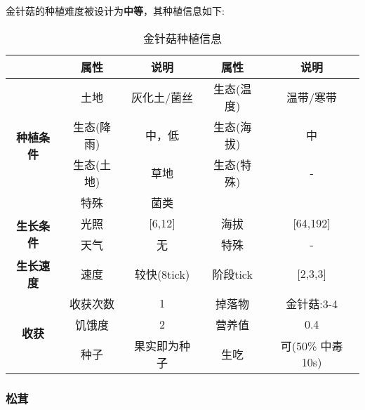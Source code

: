 金针菇的种植难度被设计为\textbf{中等}，其种植信息如下:

\begin{table}[H]
    \centering
    \caption{金针菇种植信息}
    \label{table:金针菇种植信息}
    \setlength{\tabcolsep}{4mm}
    \begin{tabular}{c|cc|cc}
        \toprule
                                           & \textbf{属性} & \textbf{说明} & \textbf{属性} & \textbf{说明} \\
        \midrule
        \multirow{4}{*}{\textbf{种植条件}} & 土地          &  灰化土/菌丝         & 生态(温度)    & 温带/寒带    \\
                                           & 生态(降雨)    & 中，低        & 生态(海拔)    & 中            \\
                                           & 生态(土地)    & 草地          & 生态(特殊)    & -             \\
                                           & 特殊          & 菌类           \\
        \midrule
        \multirow{2}{*}{\textbf{生长条件}} & 光照          & [6,12]        & 海拔          & [64,192]      \\
                                           & 天气          & 无            & 特殊          & -             \\
        \midrule
        \textbf{生长速度}                  & 速度          & 较快(8tick)     & 阶段tick      & [2,3,3]       \\
        \midrule
        \multirow{3}{*}{\textbf{收获}}     & 收获次数      & 1             & 掉落物        & 金针菇:3-4      \\
                                           & 饥饿度        & 2             & 营养值        & 0.4           \\
                                           & 种子          & 果实即为种子  & 生吃          & 可(50\% 中毒 10s)   \\
        \bottomrule
    \end{tabular}
\end{table}

\subsubsection{松茸}

